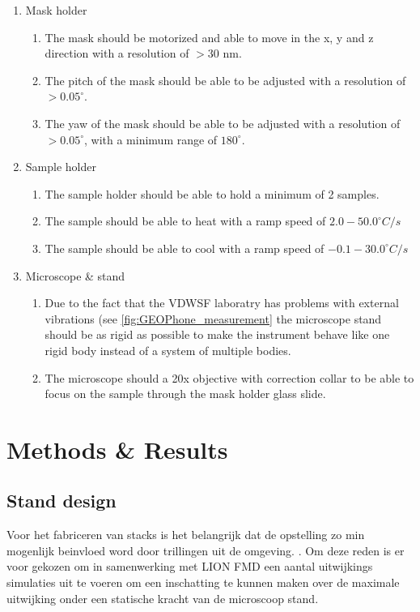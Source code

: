 \documentclass[11pt]{article}
\begin{document}
\begin{enumerate}[noitemsep]
  \item Mask holder
  \begin{enumerate}[noitemsep]
    \item The mask should be motorized and able to move in the x, y and z direction with a resolution of $>30$ nm.
    \item The pitch of the mask should be able to be adjusted with a resolution of $>0.05^{\circ}$.
    \item The yaw of the mask should be able to be adjusted with a resolution of $>0.05^{\circ}$, with a minimum range of $180^{\circ}$.
  \end{enumerate}
  \item Sample holder
  \begin{enumerate}[noitemsep]
    \item The sample holder should be able to hold a minimum of 2 samples.
    \item The sample should be able to heat with a ramp speed of $2.0 - 50.0^{\circ} C/s$
    \item The sample should be able to cool with a ramp speed of $-0.1 - 30.0^{\circ} C/s$ 
  \end{enumerate}
  \item Microscope \& stand
  \begin{enumerate}[noitemsep]
    \item Due to the fact that the VDWSF laboratry has problems with external vibrations (see \ref{fig:GEOPhone_measurement} the microscope stand should be as rigid as possible to make the instrument behave like one rigid body instead of a system of multiple bodies.
    \item The microscope should a 20x objective with correction collar to be able to focus on the sample through the mask holder glass slide.
  \end{enumerate}


\end{enumerate}

\section{Methods \& Results}
\subsection{Stand design}

Voor het fabriceren van stacks is het belangrijk dat de opstelling zo min mogenlijk beinvloed word door trillingen uit de omgeving. . Om deze reden is er voor gekozen om in samenwerking met LION FMD een aantal uitwijkings simulaties uit te voeren om een inschatting te kunnen maken over de maximale uitwijking onder een statische kracht van de microscoop stand. 
\end{document}
